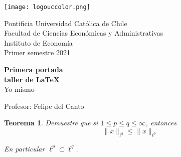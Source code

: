 \documentclass{article}
\newtheorem{teo}{Teorema}
\begin{document}
\begin{titlepage}

	\begin{minipage}{2.5cm}
		\texttt{[image: logouccolor.png]}
	\end{minipage}
	\begin{minipage}{13 cm}
	
		\begin{flushleft}
   			\noindent\large{\sc
				Pontificia Universidad Católica de Chile \\ 
		     	Facultad de Ciencias Económicas y Administrativas \\ 
		     	Instituto de Economía \\ 
				Primer semestre 2021
		     	}
		\end{flushleft}
	\end{minipage}
	
\begin{center}
	\vspace*{\fill} %
		\Huge\textbf{Primera portada}	\\
		\Huge\textbf{taller de \LaTeX}	\\
		\LARGE{Yo mismo} \\
	\vspace*{\fill}
		
	\vfill %
		
	\Large{Profesor: Felipe del Canto}

\end{center}
\end{titlepage}

\begin{teo} Demuestre que si $1 \leq p \leq q \leq \infty$, entonces
	$$\|x\|_{\ell^{q}} \leq \|x\|_{\ell^{p}}$$
	
En particular $\ell^{p} \subset \ell^{q}$.
\end{teo}
\end{document}
